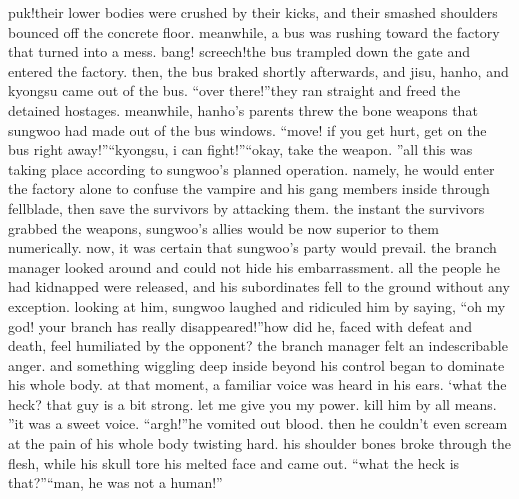 puk!their lower bodies were crushed by their kicks, and their smashed shoulders bounced off the concrete floor.
meanwhile, a bus was rushing toward the factory that turned into a mess.
bang! screech!the bus trampled down the gate and entered the factory.
 then, the bus braked shortly afterwards, and jisu, hanho, and kyongsu came out of the bus.
“over there!”they ran straight and freed the detained hostages.
 meanwhile, hanho’s parents threw the bone weapons that sungwoo had made out of the bus windows.
“move! if you get hurt, get on the bus right away!”“kyongsu, i can fight!”“okay, take the weapon.
”all this was taking place according to sungwoo’s planned operation.
 namely, he would enter the factory alone to confuse the vampire and his gang members inside through fellblade, then save the survivors by attacking them.
 the instant the survivors grabbed the weapons, sungwoo’s allies would be now superior to them numerically.
 now, it was certain that sungwoo’s party would prevail.
the branch manager looked around and could not hide his embarrassment.
 all the people he had kidnapped were released, and his subordinates fell to the ground without any exception.
looking at him, sungwoo laughed and ridiculed him by saying, “oh my god! your branch has really disappeared!”how did he, faced with defeat and death, feel humiliated by the opponent? the branch manager felt an indescribable anger.
 and something wiggling deep inside beyond his control began to dominate his whole body.
 at that moment, a familiar voice was heard in his ears.
‘what the heck? that guy is a bit strong.
 let me give you my power.
 kill him by all means.
”it was a sweet voice.
“argh!”he vomited out blood.
 then he couldn’t even scream at the pain of his whole body twisting hard.
 his shoulder bones broke through the flesh, while his skull tore his melted face and came out.
“what the heck is that?”“man, he was not a human!”

 